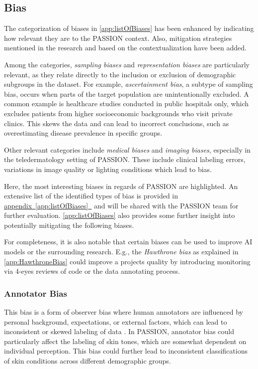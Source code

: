 \documentclass[12pt, a4paper, oneside]{book}   	%
\newcommand{\linkapp}[1]{\hyperref[#1]{appendix~\ref{#1}~\nameref{#1}}}
\renewcommand{\paragraph}[1]{%
	\subsubsection*{#1}%
}
\begin{document}
		\subsection{Bias}
		The categorization of biases in \autoref{app:listOfBiases} has been enhanced by indicating how relevant they are to the PASSION context. Also, mitigation strategies mentioned in the research and based on the contextualization have been added.
		
		Among the categories, \textit{sampling biases} and \textit{representation biases} are particularly \mbox{relevant}, as they relate directly to the inclusion or exclusion of demographic subgroups in the dataset. For example, \textit{ascertainment bias}, a subtype of sampling bias, occurs when parts of the target population are unintentionally excluded. A common example is healthcare studies conducted in public hospitals only, which excludes patients from higher socioeconomic backgrounds who visit private clinics. This skews the data and can lead to incorrect conclusions, such as overestimating disease prevalence in specific groups.
		
		Other relevant categories include \textit{medical biases} and \textit{imaging biases}, especially in the teledermatology setting of PASSION. These include clinical labeling errors, variations in image quality or lighting conditions which lead to bias.
		
		Here, the most interesting biases in regards of PASSION are highlighted. An extensive list of the identified types of bias is provided in \linkapp{app:listOfBiases} and will be shared with the PASSION team for further evaluation. \autoref{app:listOfBiases} also provides some further insight into potentially mitigating the following biases.
		
		For completeness, it is also notable that certain biases can be used to improve \gls{AI} models or the surrounding research. E.g., the \textit{Hawthrone bias} as explained in \autoref{app:HawthroneBias} could improve a projects quality by introducing monitoring via 4-eyes reviews of code or the data annotating process.
		
		
		\paragraph{Annotator Bias}
		This bias is a form of observer bias where human annotators are influenced by personal background, expectations, or external factors, which can lead to inconsistent or skewed labeling of data \autocite{Montoya_2025}. In PASSION, annotator bias could particularly affect the labeling of skin tones, which are somewhat dependent on individual perception. This bias could further lead to inconsistent classifications of skin conditions across different demographic groups. 
		
\end{document}
